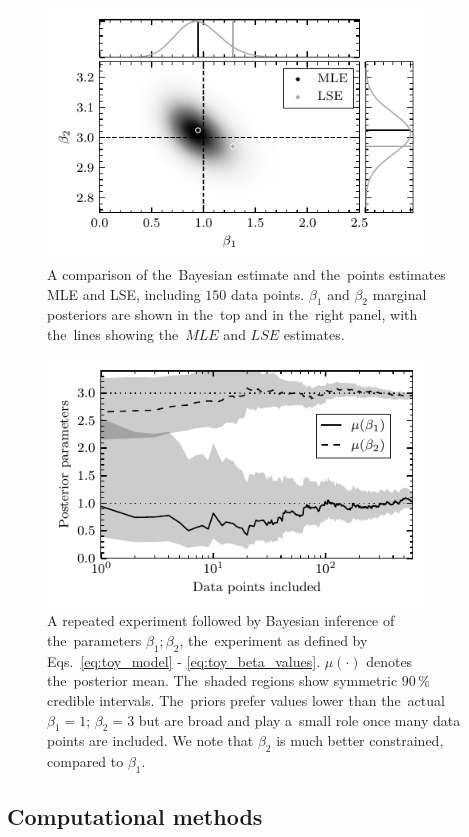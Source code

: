 \begin{figure}[ht]
 	\centering
 	\includegraphics[width=10cm]{figures/bayesian_multivariate.pdf}
 	\caption{A comparison of the~Bayesian estimate and the~points estimates MLE and LSE, including $150$ data points. $\beta_1$ and $\beta_2$ marginal posteriors are shown in the~top and in the~right panel, with the~lines showing the~$MLE$ and $LSE$ estimates.}
 	\label{fig:bayesian_multivariate}
\end{figure}

\begin{figure}[ht]
 	\centering
 	\includegraphics[width=10cm]{figures/bayesian.pdf}
 	\caption{A repeated experiment followed by Bayesian inference of the~parameters $\beta_1; \beta_2$, the~experiment as defined by Eqs.~\ref{eq:toy_model} - \ref{eq:toy_beta_values}. $\mu(\cdot)$ denotes the~posterior mean. The~shaded regions show symmetric $90 \, \%$ credible intervals. The~priors prefer values lower than the~actual $\beta_1=1;\,\beta_2=3$ but are broad and play a~small role once many data points are included. We note that $\beta_2$ is much better constrained, compared to $\beta_1$.}
 	\label{fig:bayesian_demosntration}
\end{figure}

\subsection{Computational methods}

